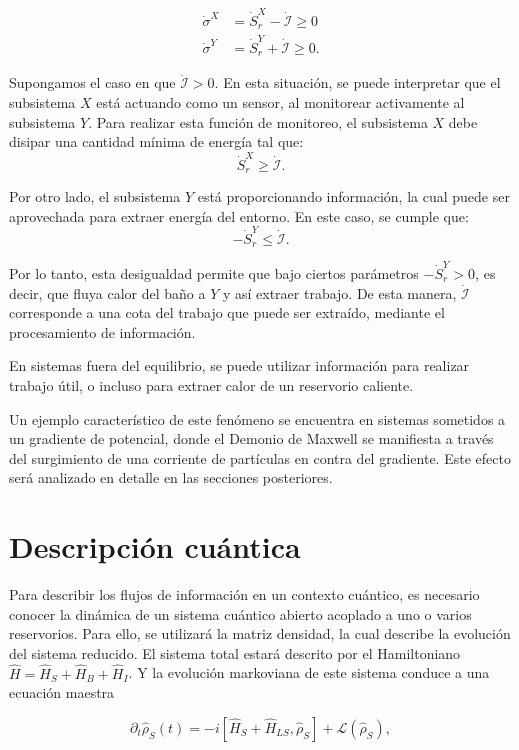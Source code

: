 \begin{align*}
    \dot{\sigma}^{X} & = \dot{S}_{r}^{X} - \dot{\mathcal{I}} \geq 0 \\
    \dot{\sigma}^{Y} & =  \dot{S}_{r}^{Y} + \dot{\mathcal{I}} \geq 0 . 
\end{align*}

Supongamos el caso en que \( \dot{\mathcal{I}} > 0 \). En esta situación, se puede interpretar que el subsistema \( X \) está actuando como un sensor, al monitorear activamente al subsistema \( Y \). Para realizar esta función de monitoreo, el subsistema \( X \) debe disipar una cantidad mínima de energía tal que:
\[
\dot{S}_{r}^{X} \geq \dot{\mathcal{I}}.
\]

Por otro lado, el subsistema \( Y \) está proporcionando información, la cual puede ser aprovechada para extraer energía del entorno. En este caso, se cumple que:
\[
-\dot{S}_{r}^{Y} \leq \dot{\mathcal{I}}.
\]

Por lo tanto, esta desigualdad permite que bajo ciertos parámetros $-\dot{S}^{Y}_{r}>0$, es decir, que fluya calor del baño a $Y$ y así extraer trabajo. De esta manera, $\dot{\mathcal{I}}$ corresponde a una cota del trabajo que puede ser extraído, mediante el procesamiento de información.

En sistemas fuera del equilibrio, se puede utilizar información para realizar trabajo útil, o incluso para extraer calor de un reservorio caliente.

Un ejemplo característico de este fenómeno se encuentra en sistemas sometidos a un gradiente de potencial, donde el Demonio de Maxwell se manifiesta a través del surgimiento de una corriente de partículas en contra del gradiente. Este efecto será analizado en detalle en las secciones posteriores.


\section{Descripción cuántica}
Para describir los flujos de información en un contexto cuántico, es necesario conocer la dinámica de un sistema cuántico abierto acoplado a uno o varios reservorios. Para ello, se utilizará la matriz densidad, la cual describe la evolución del sistema reducido. El sistema total estará descrito por el Hamiltoniano $\hat{H} = \hat{H}_{S} + \hat{H}_{B} + \hat{H}_{I}$. Y la evolución markoviana de este sistema conduce a una ecuación maestra

\begin{equation*}
    \partial_{t}\hat{\rho}_{S}(t) = - i[\hat{H}_{S} + \hat{H}_{LS},\hat{\rho}_{S}] + \mathcal{L}(\hat{\rho}_{S}),
\end{equation*}


